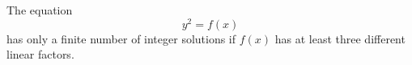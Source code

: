 \begin{proposition}\label{eq:165}
    The equation
\[
    y^2=f(x)
\]
    has only a finite number of integer solutions if $f(x)$ has at least three different linear factors.
\end{proposition}
